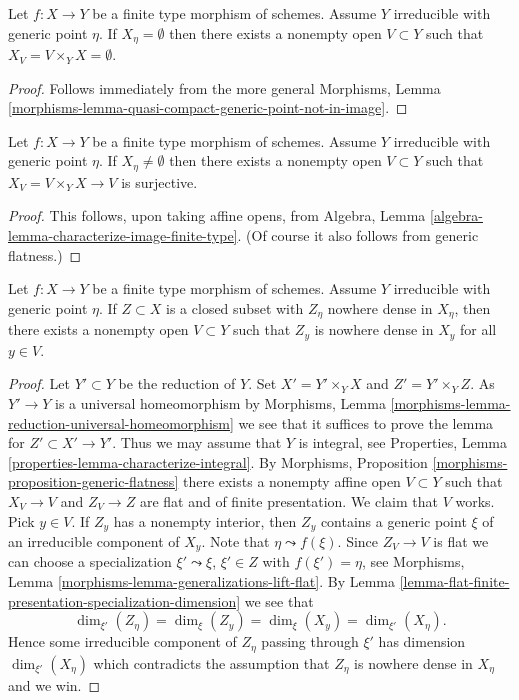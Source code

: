 \begin{lemma}
\label{lemma-empty-generic-fibre}
Let $f : X \to Y$ be a finite type morphism of schemes. Assume
$Y$ irreducible with generic point $\eta$. If $X_\eta = \emptyset$
then there exists a nonempty open $V \subset Y$ such that
$X_V = V \times_Y X = \emptyset$.
\end{lemma}

\begin{proof}
Follows immediately from the more general
Morphisms,
Lemma \ref{morphisms-lemma-quasi-compact-generic-point-not-in-image}.
\end{proof}

\begin{lemma}
\label{lemma-nonempty-generic-fibre}
Let $f : X \to Y$ be a finite type morphism of schemes. Assume
$Y$ irreducible with generic point $\eta$. If $X_\eta \not = \emptyset$
then there exists a nonempty open $V \subset Y$ such that
$X_V = V \times_Y X \to V$ is surjective.
\end{lemma}

\begin{proof}
This follows, upon taking affine opens, from
Algebra, Lemma \ref{algebra-lemma-characterize-image-finite-type}.
(Of course it also follows from generic flatness.)
\end{proof}

\begin{lemma}
\label{lemma-nowhere-dense-generic-fibre}
Let $f : X \to Y$ be a finite type morphism of schemes. Assume
$Y$ irreducible with generic point $\eta$.
If $Z \subset X$ is a closed subset with $Z_\eta$ nowhere dense
in $X_\eta$, then there exists a nonempty open $V \subset Y$ such
that $Z_y$ is nowhere dense in $X_y$ for all $y \in V$.
\end{lemma}

\begin{proof}
Let $Y' \subset Y$ be the reduction of $Y$.
Set $X' = Y' \times_Y X$ and $Z' = Y' \times_Y Z$.
As $Y' \to Y$ is a universal homeomorphism by
Morphisms, Lemma \ref{morphisms-lemma-reduction-universal-homeomorphism}
we see that it suffices to prove the lemma for $Z' \subset X' \to Y'$.
Thus we may assume that $Y$ is integral, see
Properties, Lemma \ref{properties-lemma-characterize-integral}.
By
Morphisms, Proposition \ref{morphisms-proposition-generic-flatness}
there exists a nonempty affine open $V \subset Y$ such that
$X_V \to V$ and $Z_V \to Z$ are flat and of finite presentation.
We claim that $V$ works.
Pick $y \in V$. If $Z_y$ has a nonempty interior, then $Z_y$ contains
a generic point $\xi$ of an irreducible component of $X_y$.
Note that $\eta \leadsto f(\xi)$. Since $Z_V \to V$ is flat we can
choose a specialization $\xi' \leadsto \xi$, $\xi' \in Z$
with $f(\xi') = \eta$, see
Morphisms, Lemma \ref{morphisms-lemma-generalizations-lift-flat}.
By
Lemma \ref{lemma-flat-finite-presentation-specialization-dimension}
we see that
$$
\dim_{\xi'}(Z_\eta) = \dim_{\xi}(Z_y) = \dim_{\xi}(X_y) = \dim_{\xi'}(X_\eta).
$$
Hence some irreducible component of $Z_\eta$ passing through $\xi'$ has
dimension $\dim_{\xi'}(X_\eta)$ which contradicts the assumption that
$Z_\eta$ is nowhere dense in $X_\eta$ and we win.
\end{proof}


